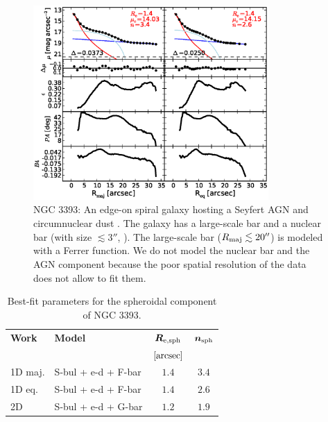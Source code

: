 \documentclass[preprint2]{emulateapj}
\newcommand{\fitfigurewidth}{0.8\textwidth}
\begin{document}
  \begin{figure}[h]
  \begin{center}
  \includegraphics[width=\fitfigurewidth]{images/n3393_1Dfit.eps}
  \caption{NGC 3393: 
  An edge-on spiral galaxy hosting a Seyfert AGN \citep{diaz1988n3393} and 
  circumnuclear dust \citep{martini2003}.
  The galaxy has a large-scale bar and a nuclear bar (with size $\lesssim 3''$, \citealt{erwin2004}).  
  The large-scale bar ($R_{\rm maj} \lesssim 20''$) is modeled with a Ferrer function.
  We do not model the nuclear bar and the AGN component because the poor spatial resolution of the data does not allow to fit them.
  }
  \end{center}
  \end{figure}

  \begin{table}[h]
  \small
  \caption{Best-fit parameters for the spheroidal component of NGC 3393.}
  \begin{center}
  \begin{tabular}{llcc}
  \hline
  {\bf Work} & {\bf Model}   & $\bm R_{\rm e,sph}$    & $\bm n_{\rm sph}$ \\
    &  &  $[\rm arcsec]$ & \\
  \hline
  1D maj. & S-bul + e-d + F-bar & $1.4$  &  $3.4$ \\
  1D eq.  & S-bul + e-d + F-bar & $1.4$  &  $2.6$ \\
  2D      & S-bul + e-d + G-bar & $1.2$  &  $1.9$ \\
  \hline
  \end{tabular}
  \end{center}
  \label{tab:n3393}
  \end{table}
\end{document}
